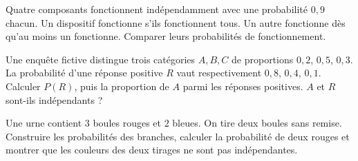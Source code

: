 \documentclass[11pt,a4paper]{article}
\begin{document}
\par\noindent\begin{minipage}{\linewidth}
Quatre composants fonctionnent indépendamment avec une probabilité $0,9$ chacun. Un dispositif fonctionne s’ils fonctionnent tous. Un autre fonctionne dès qu’au moins un fonctionne. Comparer leurs probabilités de fonctionnement.
\end{minipage}\par
\par\noindent\begin{minipage}{\linewidth}
Une enquête fictive distingue trois catégories $A,B,C$ de proportions $0,2$, $0,5$, $0,3$. La probabilité d’une réponse positive $R$ vaut respectivement $0,8$, $0,4$, $0,1$. Calculer $P(R)$, puis la proportion de $A$ parmi les réponses positives. $A$ et $R$ sont-ils indépendants ?
\end{minipage}\par
\par\noindent\begin{minipage}{\linewidth}
Une urne contient $3$ boules rouges et $2$ bleues. On tire deux boules sans remise. Construire les probabilités des branches, calculer la probabilité de deux rouges et montrer que les couleurs des deux tirages ne sont pas indépendantes.
\end{minipage}\par
\end{document}
